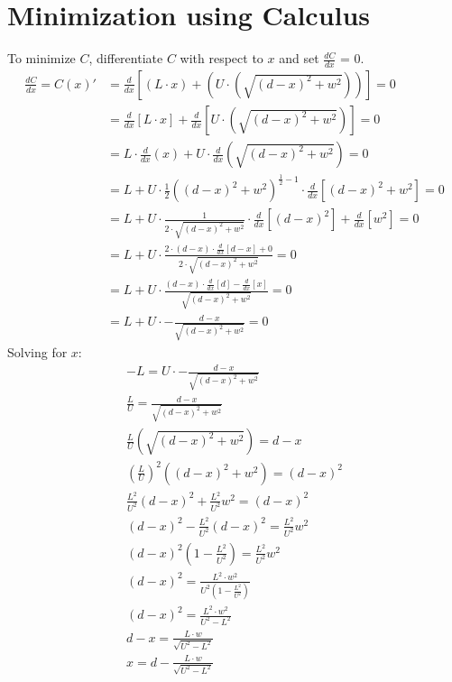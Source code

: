 \documentclass{article}
\begin{document}
\section{Minimization using Calculus}
To minimize \( C \), differentiate \( C \) with respect to \( x \) and set \( \frac{dC}{dx} \) = 0.
\begin{align*}
    \frac{dC}{dx} = C(x)' &= \frac{d}{dx}\left[(L \cdot x) + (U \cdot \left(\sqrt{\left(d - x\right)^2 + w^2}\right))\right] = 0 \\
    &= \frac{d}{dx}\left[L \cdot x\right] + \frac{d}{dx}\left[U \cdot \left(\sqrt{\left(d - x\right)^2 + w^2}\right)\right] = 0 \\
    &= L \cdot \frac{d}{dx}(x) + U \cdot \frac{d}{dx}\left(\sqrt{(d - x)^2 + w^2}\right) = 0 \\
    &= L + U \cdot \frac{1}{2}\left((d - x)^2 + w^2\right)^{\frac{1}{2} - 1} \cdot \frac{d}{dx}\left[(d - x)^2 + w^2\right] = 0 \\
    &= L + U \cdot \frac{1}{2 \cdot \sqrt{(d - x)^2 + w^2}} \cdot \frac{d}{dx}\left[(d - x)^2\right] + \frac{d}{dx}\left[w^2\right] = 0 \\
    &= L + U \cdot \frac{2 \cdot \left(d - x\right) \cdot \frac{d}{dx}\left[d - x\right] + 0}{2 \cdot \sqrt{(d - x)^2 + w^2}} = 0 \\
    &= L + U \cdot \frac{(d - x) \cdot \frac{d}{dx}\left[d\right] - \frac{d}{dx}\left[x\right]}{\sqrt{(d - x)^2 + w^2}} = 0 \\
    &= L + U \cdot -\frac{d - x}{\sqrt{(d - x)^2 + w^2}} = 0
\end{align*}
Solving for \( x \):
\begin{align*}
    -L = U \cdot -\frac{d - x}{\sqrt{(d - x)^2 + w^2}} \\
    \frac{L}{U} = \frac{d - x}{\sqrt{(d - x)^2 + w^2}} \\
    \frac{L}{U} \left(\sqrt{(d - x)^2 + w^2}\right) = d - x \\
    \left(\frac{L}{U}\right)^2 \left((d - x)^2 + w^2\right) = (d - x)^2 \\
    \frac{L^2}{U^2} (d - x)^2 + \frac{L^2}{U^2} w^2 = (d - x)^2 \\
    (d - x)^2 - \frac{L^2}{U^2} (d - x)^2 = \frac{L^2}{U^2} w^2 \\
    (d - x)^2 \left(1 - \frac{L^2}{U^2}\right) = \frac{L^2}{U^2} w^2 \\
    (d - x)^2 = \frac{L^2 \cdot w^2}{U^2 \left(1 - \frac{L^2}{U^2}\right)} \\
    (d - x)^2 = \frac{L^2 \cdot w^2}{U^2 - L^2} \\
    d - x = \frac{L \cdot w}{\sqrt{U^2 - L^2}} \\
    x = d - \frac{L \cdot w}{\sqrt{U^2 - L^2}}
\end{align*}
\end{document}
